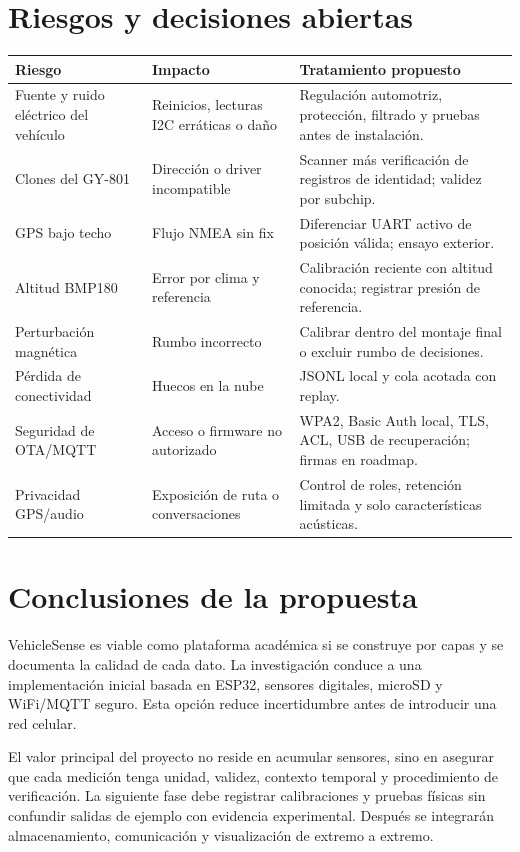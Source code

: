 \documentclass[11pt,a4paper,oneside]{report}
\begin{document}
\chapter{Riesgos y decisiones abiertas}

\begin{longtable}{p{4.1cm}p{5.0cm}p{5.0cm}}
\toprule
\textbf{Riesgo} & \textbf{Impacto} & \textbf{Tratamiento propuesto}\\
\midrule
\endhead
Fuente y ruido eléctrico del vehículo & Reinicios, lecturas I2C erráticas o daño & Regulación automotriz, protección, filtrado y pruebas antes de instalación.\\
Clones del GY-801 & Dirección o driver incompatible & Scanner más verificación de registros de identidad; validez por subchip.\\
GPS bajo techo & Flujo NMEA sin fix & Diferenciar UART activo de posición válida; ensayo exterior.\\
Altitud BMP180 & Error por clima y referencia & Calibración reciente con altitud conocida; registrar presión de referencia.\\
Perturbación magnética & Rumbo incorrecto & Calibrar dentro del montaje final o excluir rumbo de decisiones.\\
Pérdida de conectividad & Huecos en la nube & JSONL local y cola acotada con replay.\\
Seguridad de OTA/MQTT & Acceso o firmware no autorizado & WPA2, Basic Auth local, TLS, ACL, USB de recuperación; firmas en roadmap.\\
Privacidad GPS/audio & Exposición de ruta o conversaciones & Control de roles, retención limitada y solo características acústicas.\\
\bottomrule
\end{longtable}

\chapter{Conclusiones de la propuesta}
VehicleSense es viable como plataforma académica si se construye por capas y se
documenta la calidad de cada dato. La investigación conduce a una implementación
inicial basada en ESP32, sensores digitales, microSD y WiFi/MQTT seguro. Esta opción
reduce incertidumbre antes de introducir una red celular.

El valor principal del proyecto no reside en acumular sensores, sino en asegurar que
cada medición tenga unidad, validez, contexto temporal y procedimiento de verificación.
La siguiente fase debe registrar calibraciones y pruebas físicas sin confundir salidas
de ejemplo con evidencia experimental. Después se integrarán almacenamiento,
comunicación y visualización de extremo a extremo.
\end{document}
